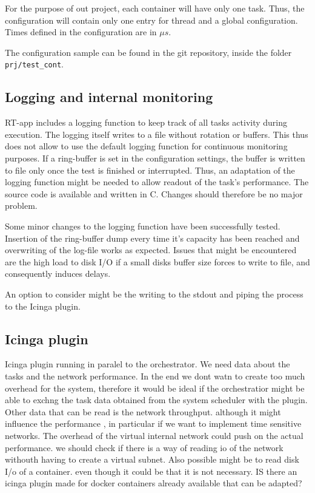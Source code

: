 \documentclass[]{scrartcl}
\begin{document}
For the purpose of out project, each container will have only one task. 
Thus, the configuration will contain only one entry for thread and a global configuration.
Times defined in the configuration are in $\mu s$.

The configuration sample can be found in the git repository, inside the folder \texttt{prj/test\_cont}.

\subsection{Logging and internal monitoring}

RT-app includes a logging function to keep track of all tasks activity during execution. The logging itself writes to a file without rotation or buffers.
This thus does not allow to use the default logging function for continuous monitoring purposes.
If a ring-buffer is set in the configuration settings, the buffer is written to file only once the test is finished or interrupted. 
Thus, an adaptation of the logging function might be needed to allow readout of the task's performance.
The source code is available and written in C. Changes should therefore be no major problem.

Some minor changes to the logging function have been successfully tested. Insertion of the ring-buffer dump every time it's capacity has been reached and overwriting of the log-file works as expected.
Issues that might be encountered are the high load to disk I/O if a small disks buffer size forces to write to file, and consequently induces delays.

An option to consider might be the writing to the stdout and piping the process to the Icinga plugin. 


\subsection{Icinga plugin}

Icinga plugin running in paralel to the orchestrator. We need data about the tasks and the network performance. In the end we dont watn to create too much overhead for the system, therefore it would be ideal if the orchestratior might be able to exchng the task data obtained from the system scheduler with the plugin.
Other data that can be read is the network throughput. although it might influence the performance , in particular if we want to implement time sensitive networks.
The overhead of the virtual internal network could push on the actual performance. we should check if there is a way of reading io of the network withouth having to create a virtual subnet.
Also possible might be to read disk I/o of a container. even though it could be that it is not necessary. 
IS there an icinga plugin made for docker containers already available that can be adapted?
\end{document}
